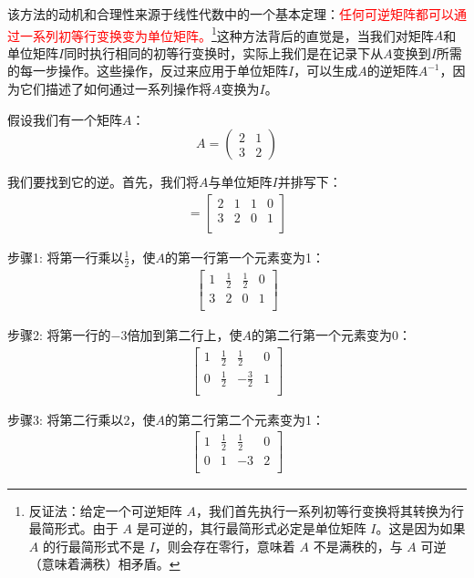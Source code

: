 该方法的动机和合理性来源于线性代数中的一个基本定理：\textcolor{red}{任何可逆矩阵都可以通过一系列初等行变换变为单位矩阵。}\footnote{
反证法：给定一个可逆矩阵 \(A\)，我们首先执行一系列初等行变换将其转换为行最简形式。由于 \(A\) 是可逆的，其行最简形式必定是单位矩阵 \(I\)。这是因为如果 \(A\) 的行最简形式不是 \(I\)，则会存在零行，意味着 \(A\) 不是满秩的，与 \(A\) 可逆（意味着满秩）相矛盾。
}这种方法背后的直觉是，当我们对矩阵\(A\)和单位矩阵\(I\)同时执行相同的初等行变换时，实际上我们是在记录下从\(A\)变换到\(I\)所需的每一步操作。这些操作，反过来应用于单位矩阵\(I\)，可以生成\(A\)的逆矩阵\(A^{-1}\)，因为它们描述了如何通过一系列操作将\(A\)变换为\(I\)。

\begin{exercise}
假设我们有一个矩阵\(A\)：
\[A = \begin{pmatrix} 2 & 1 \\ 3 & 2 \end{pmatrix}\]

我们要找到它的逆。首先，我们将\(A\)与单位矩阵\(I\)并排写下：
\begin{align*}
[A|I] = \left[\begin{array}{cc|cc}
2 & 1 & 1 & 0 \\
3 & 2 & 0 & 1 \\
\end{array}\right]
\end{align*}

步骤1: 将第一行乘以\(\frac{1}{2}\)，使\(A\)的第一行第一个元素变为1：
\begin{align*}
\left[\begin{array}{cc|cc}
1 & \frac{1}{2} & \frac{1}{2} & 0 \\
3 & 2 & 0 & 1 \\
\end{array}\right]
\end{align*}

步骤2: 将第一行的\(-3\)倍加到第二行上，使\(A\)的第二行第一个元素变为0：
\begin{align*}
\left[\begin{array}{cc|cc}
1 & \frac{1}{2} & \frac{1}{2} & 0 \\
0 & \frac{1}{2} & -\frac{3}{2} & 1 \\
\end{array}\right]
\end{align*}

步骤3: 将第二行乘以2，使\(A\)的第二行第二个元素变为1：
\begin{align*}
\left[\begin{array}{cc|cc}
1 & \frac{1}{2} & \frac{1}{2} & 0 \\
0 & 1 & -3 & 2 \\
\end{array}\right]
\end{align*}


\end{exercise}
